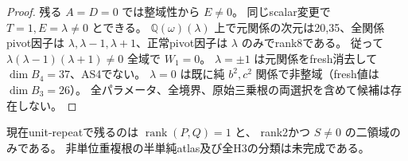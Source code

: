\begin{proof}
残る $A=D=0$ では整域性から $E\ne0$。
同じscalar変更で $T=1,E=\lambda\ne0$ とできる。
$\mathbb Q(\omega)(\lambda)$ 上で元関係の次元は20,35、全関係pivot因子は
$\lambda,\lambda-1,\lambda+1$、正常pivot因子は $\lambda$ のみでrank8である。
従って $\lambda(\lambda-1)(\lambda+1)\ne0$ 全域で $W_1=0$。
$\lambda=\pm1$ は元関係をfresh消去して $\dim B_4=37$、AS4でない。
$\lambda=0$ は既に純 $b^2,c^2$ 関係で非整域（fresh値は $\dim B_3=26$）。
全パラメータ、全境界、原始三乗根の両選択を含めて候補は存在しない。
\end{proof}

現在unit-repeatで残るのは $\operatorname{rank}(P,Q)=1$ と、
rank2かつ $S\ne0$ の二領域のみである。
非単位重複根の半単純atlas及び全H3の分類は未完成である。
